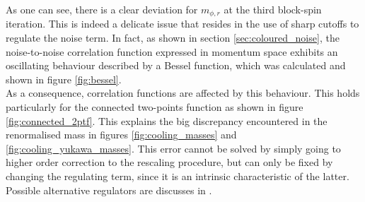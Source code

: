 As one can see, there is a clear deviation for $m_{\phi, r}$ at the third block-spin iteration.
This is indeed a delicate issue that resides in the use of sharp cutoffs to regulate the noise term. In fact, as shown in section \ref{sec:coloured_noise}, the noise-to-noise correlation function expressed in momentum space exhibits an oscillating behaviour described by a Bessel function, which was calculated and shown in figure \ref{fig:bessel}. \\
As a consequence, correlation functions are affected by this behaviour. This holds particularly for the connected two-points function as shown in figure \ref{fig:connected_2ptf}. This explains the big discrepancy encountered in the renormalised mass in figures \ref{fig:cooling_masses} and \ref{fig:cooling_yukawa_masses}. This error cannot be solved
by simply going to higher order correction to the rescaling procedure, but can only be fixed by changing the regulating term, since it is an intrinsic characteristic of the latter. Possible alternative regulators are discusses in \cite{Pawlowski2017CoolingNoise}.
